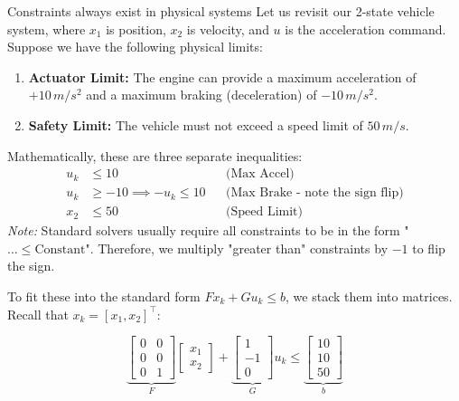 \begin{examplebox}{Constraints always exist in physical systems}
Let us revisit our 2-state vehicle system, where $x_1$ is position, $x_2$ is velocity, and $u$ is the acceleration command. Suppose we have the following physical limits:
\begin{enumerate}
	\item \textbf{Actuator Limit:} The engine can provide a maximum acceleration of $+10 \, m/s^2$ and a maximum braking (deceleration) of $-10 \, m/s^2$.
	\item \textbf{Safety Limit:} The vehicle must not exceed a speed limit of $50 \, m/s$.
\end{enumerate}

Mathematically, these are three separate inequalities:
\begin{align*}
	u_k &\leq 10 && \text{(Max Accel)} \\
	u_k &\geq -10 \implies -u_k \leq 10 && \text{(Max Brake - note the sign flip)} \\
	x_2 &\leq 50 && \text{(Speed Limit)}
\end{align*}
\textit{Note:} Standard solvers usually require all constraints to be in the form "$\dots \leq \text{Constant}$". Therefore, we multiply "greater than" constraints by $-1$ to flip the sign.

To fit these into the standard form $F x_k + G u_k \leq b$, we stack them into matrices. Recall that $x_k = [x_1, x_2]^\top $:

\begin{equation}
	\underbrace{
		\begin{bmatrix}
			0 & 0 \\
			0 & 0 \\
			0 & 1
		\end{bmatrix}
	}_{F}
	\begin{bmatrix} x_1 \\ x_2 \end{bmatrix}
	+
	\underbrace{
		\begin{bmatrix}
			1 \\
			-1 \\
			0
		\end{bmatrix}
	}_{G}
	u_k
	\leq
	\underbrace{
		\begin{bmatrix} 
			10 \\
			10 \\
			50 
		\end{bmatrix}
	}_{b}
\end{equation}


\end{examplebox}
